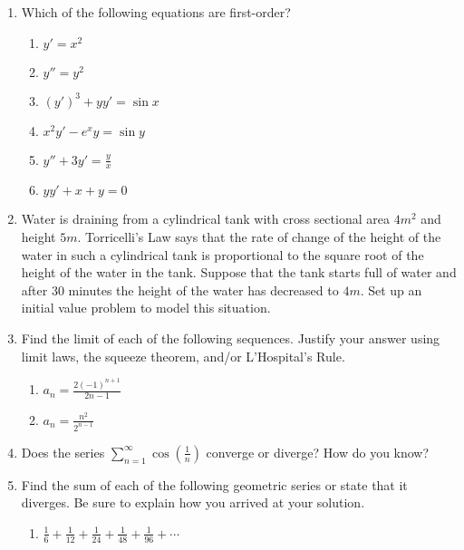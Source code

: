 \documentclass{nosvagor-notes}
\begin{document}
\begin{enumerate}
  \item Which of the following equations are first-order?
    \begin{multicols}{2}
      \begin{enumerate}
        \item \(y' = x^2 \)
        \item \(y'' = y^2\)
        \item \((y')^3 + yy' = \sin x\)
        \item \(x^2y' - e^xy = \sin y\)
        \item \(y'' + 3y' = \frac{y}{x}\)
        \item \(yy' + x + y = 0\)
      \end{enumerate}
    \end{multicols}

  \newpage

  \item Water is draining from a cylindrical tank with cross sectional area
  \(4m^2\) and height \(5m\). Torricelli’s  Law says that the rate of change of the
  height of the water in such a cylindrical tank is proportional to the square
  root of the height of the water in the tank. Suppose that the tank starts
  full of water and after 30 minutes the height of the water has decreased to
  \(4m\). Set up an initial value problem to model this situation.

  \newpage

  \item Find the limit of each of the following sequences. Justify your answer
    using limit laws, the squeeze theorem, and/or L’Hospital’s Rule.
    \begin{enumerate}
      \item \(\displaystyle a_n = \frac{2(-1)^{n+1}}{2n-1}\)
      \vspace{300pt}

      \item \(\displaystyle a_n = \frac{n^2}{2^{n-1}}\)
    \end{enumerate}

  \newpage

  \item Does the series \(\displaystyle \sum_{n=1}^{\infty} \cos \left(
    \frac{1}{n} \right) \) converge or diverge? How do you know?
    \vspace{160pt}

  \item Find the sum of each of the following geometric series or state that it
    diverges. Be sure to explain how you arrived at your solution.
    \begin{enumerate}
      \item \(\frac{1}{6} + \frac{1}{12} + \frac{1}{24} + \frac{1}{48} + \frac{1}{96} + \cdots\)
      \vspace{200pt}


\end{enumerate}
\end{enumerate}
\end{document}
